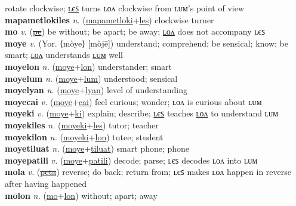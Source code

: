 rotate clockwise; \hyperref[mapametlokiles]{ʟєꜱ} turns ʟᴏᴧ clockwise from ʟᴜᴍ’s point of view \label{mapametloki} \\
\textbf{mapametlokiles} \textit{n.} (\hyperref[mapametloki]{mapametloki}+\hyperref[les]{les})
clockwise turner \label{mapametlokiles} \\
\textbf{mo} \textit{v.} (\hyperref[pe]{\sout{pe}})
be without; be apart; be away; \hyperref[molon]{ʟᴏᴧ} does not accompany ʟєꜱ \label{mo} \\
\textbf{moye} \textit{v.} (Yor. ⟨mòye⟩ [mòjē])
understand; comprehend; be sensical; know; be smart; \hyperref[moyelon]{ʟᴏᴧ} understands \hyperref[moyelum]{ʟᴜᴍ} well \label{moye} \\
\textbf{moyelon} \textit{n.} (\hyperref[moye]{moye}+\hyperref[lon]{lon})
understander; smart \label{moyelon} \\
\textbf{moyelum} \textit{n.} (\hyperref[moye]{moye}+\hyperref[lum]{lum})
understood; sensical \label{moyelum} \\
\textbf{moyelyan} \textit{n.} (\hyperref[moye]{moye}+\hyperref[lyan]{lyan})
level of understanding \label{moyelyan} \\
\textbf{moyecai} \textit{v.} (\hyperref[moye]{moye}+\hyperref[cai]{cai})
feel curious; wonder; ʟᴏᴧ is curious about ʟᴜᴍ \label{moyecai} \\
\textbf{moyeki} \textit{v.} (\hyperref[moye]{moye}+\hyperref[ki]{ki})
explain; describe; \hyperref[moyekiles]{ʟєꜱ} teaches \hyperref[moyekilon]{ʟᴏᴧ} to understand ʟᴜᴍ \label{moyeki} \\
\textbf{moyekiles} \textit{n.} (\hyperref[moyeki]{moyeki}+\hyperref[les]{les})
tutor; teacher \label{moyekiles} \\
\textbf{moyekilon} \textit{n.} (\hyperref[moyeki]{moyeki}+\hyperref[lon]{lon})
tutee; student \label{moyekilon} \\
\textbf{moyetiluat} \textit{n.} (\hyperref[moye]{moye}+\hyperref[tiluat]{tiluat})
smart phone; phone \label{moyetiluat} \\
\textbf{moyepatili} \textit{v.} (\hyperref[moye]{moye}+\hyperref[patili]{patili})
decode; parse; ʟєꜱ decodes ʟᴏᴧ into ʟᴜᴍ \label{moyepatili} \\
\textbf{mola} \textit{v.} (\hyperref[peta]{\sout{peta}})
reverse; do back; return from; ʟєꜱ makes ʟᴏᴧ happen in reverse after having happened \label{mola} \\
\textbf{molon} \textit{n.} (\hyperref[mo]{mo}+\hyperref[lon]{lon})
without; apart; away \label{molon} \\
